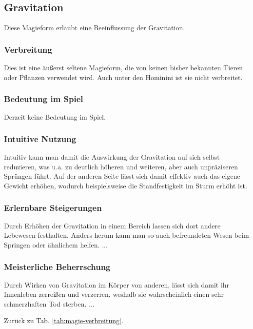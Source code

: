\subsection{Gravitation}\label{magie:gravitation}
Diese Magieform erlaubt eine Beeinflussung der Gravitation.

\subsubsection{Verbreitung}
Dies ist eine äußerst seltene Magieform, die von keinen bisher bekannten Tieren oder Pflanzen verwendet wird.
Auch unter den Hominini ist sie nicht verbreitet.

\subsubsection{Bedeutung im Spiel}
Derzeit keine Bedeutung im Spiel.

\subsubsection{Intuitive Nutzung}
Intuitiv kann man damit die Auswirkung der Gravitation auf sich selbst reduzieren, was u.a. zu deutlich höheren und weiteren, aber auch unpräziseren Sprüngen führt.
Auf der anderen Seite lässt sich damit effektiv auch das eigene Gewicht erhöhen, wodurch beispielsweise die Standfestigkeit im Sturm erhöht ist.

\subsubsection{Erlernbare Steigerungen}
\begin{outline}
	\1 Durch Erhöhen der Gravitation in einem Bereich lassen sich dort andere Lebewesen festhalten.
	\1 Anders herum kann man so auch befreundeten Wesen beim Springen oder ähnlichem helfen.
	\1 ...
\end{outline}

\subsubsection{Meisterliche Beherrschung} 
\begin{outline}
	\1 Durch Wirken von Gravitation im Körper von anderen, lässt sich damit ihr Innenleben zerreißen und verzerren, weshalb sie wahrscheinlich einen sehr schmerzhaften Tod sterben.
	\1 ...
\end{outline}
Zurück zu Tab. \ref{tab:magie-verbreitung}.



